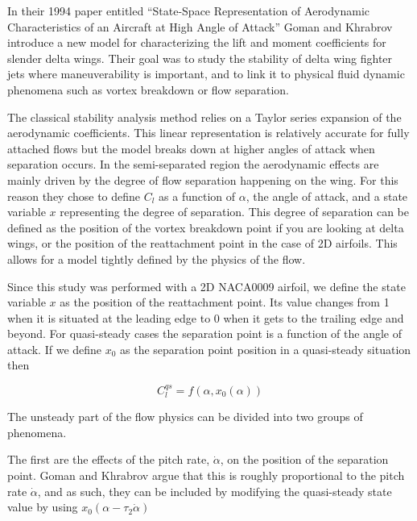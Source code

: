 
In their 1994 paper entitled ``State-Space Representation of Aerodynamic Characteristics of an Aircraft at High Angle of Attack'' \cite{GK} Goman and Khrabrov introduce a new model for characterizing the lift and moment coefficients for slender delta wings.
Their goal was to study the stability of delta wing fighter jets where maneuverability is important, and to link it to physical fluid dynamic phenomena such as vortex breakdown or flow separation.

\par The classical stability analysis method relies on a Taylor series expansion of the aerodynamic coefficients.
This linear representation is relatively accurate for fully attached flows but the model breaks down at higher angles of attack when separation occurs.
In the semi-separated region the aerodynamic effects are mainly driven by the degree of flow separation happening on the wing.
For this reason they chose to define $C_l$ as a function of $\alpha$, the angle of attack, and a state variable $x$ representing the degree of separation.
This degree of separation can be defined as the position of the vortex breakdown point if you are looking at delta wings, or the position of the reattachment point in the case of 2D airfoils.
This allows for a model tightly defined by the physics of the flow.


Since this study was performed with a 2D NACA0009 airfoil, we define the state variable $x$ as the position of the reattachment point.
Its value changes from 1 when it is situated at the leading edge to 0 when it gets to the trailing edge and beyond.
For quasi-steady cases the separation point is a function of the angle of attack. If we define $x_0$ as the separation point position in a quasi-steady situation then

\begin{equation}
  C_l^{qs} = f(\alpha,x_0(\alpha))
  \label{eqn:qs_Cl}
\end{equation}

The unsteady part of the flow physics can be divided into two groups of phenomena.

\par The first are the effects of the pitch rate, $\dot{\alpha}$, on the position of the separation point.
Goman and Khrabrov argue that this is roughly proportional to the pitch rate $\dot{\alpha}$, and as such, they can be included by modifying the quasi-steady state value by using $x_0 (\alpha - \tau_2 \dot{\alpha})$ 

